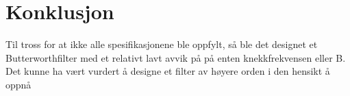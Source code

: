 \section{Konklusjon}
\label{sec:conclusion}

Til tross for at ikke alle spesifikasjonene ble oppfylt, så ble det designet et Butterworthfilter med et relativt lavt avvik på på enten knekkfrekvensen eller B. Det kunne ha vært vurdert å designe et filter av høyere orden i den hensikt å oppnå 